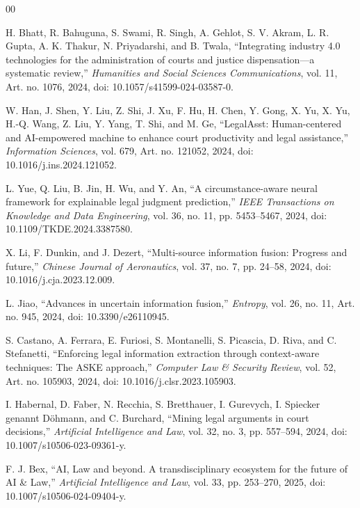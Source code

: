 \documentclass[conference]{IEEEtran}
\begin{document}
\begin{thebibliography}{00}

 H. Bhatt, R. Bahuguna, S. Swami, R. Singh, A. Gehlot, S.
V. Akram, L. R. Gupta, A. K. Thakur, N. Priyadarshi, and B. Twala,
``Integrating industry 4.0 technologies for the administration of courts
and justice dispensation---a systematic review,'' \emph{Humanities and
Social Sciences Communications}, vol. 11, Art. no. 1076, 2024, doi:
10.1057/s41599-024-03587-0.

 W. Han, J. Shen, Y. Liu, Z. Shi, J. Xu, F. Hu, H. Chen, Y.
Gong, X. Yu, X. Yu, H.-Q. Wang, Z. Liu, Y. Yang, T. Shi, and M. Ge,
``LegalAsst: Human-centered and AI-empowered machine to enhance court
productivity and legal assistance,'' \emph{Information Sciences}, vol.
679, Art. no. 121052, 2024, doi: 10.1016/j.ins.2024.121052.

 L. Yue, Q. Liu, B. Jin, H. Wu, and Y. An, ``A
circumstance-aware neural framework for explainable legal judgment
prediction,'' \emph{IEEE Transactions on Knowledge and Data Engineering},
vol. 36, no. 11, pp. 5453--5467, 2024, doi: 10.1109/TKDE.2024.3387580.

 X. Li, F. Dunkin, and J. Dezert, ``Multi-source
information fusion: Progress and future,'' \emph{Chinese Journal of
Aeronautics}, vol. 37, no. 7, pp. 24--58, 2024, doi:
10.1016/j.cja.2023.12.009.

 L. Jiao, ``Advances in uncertain information fusion,''
\emph{Entropy}, vol. 26, no. 11, Art. no. 945, 2024, doi:
10.3390/e26110945.

 S. Castano, A. Ferrara, E. Furiosi, S. Montanelli, S.
Picascia, D. Riva, and C. Stefanetti, ``Enforcing legal information
extraction through context-aware techniques: The ASKE approach,''
\emph{Computer Law \& Security Review}, vol. 52, Art. no. 105903, 2024,
doi: 10.1016/j.clsr.2023.105903.

 I. Habernal, D. Faber, N. Recchia, S. Bretthauer, I.
Gurevych, I. Spiecker genannt D\"{o}hmann, and C. Burchard, ``Mining legal
arguments in court decisions,'' \emph{Artificial Intelligence and Law},
vol. 32, no. 3, pp. 557--594, 2024, doi: 10.1007/s10506-023-09361-y.

 F. J. Bex, ``AI, Law and beyond. A transdisciplinary
ecosystem for the future of AI \& Law,'' \emph{Artificial Intelligence and
Law}, vol. 33, pp. 253--270, 2025, doi: 10.1007/s10506-024-09404-y.


\end{thebibliography}
\end{document}
